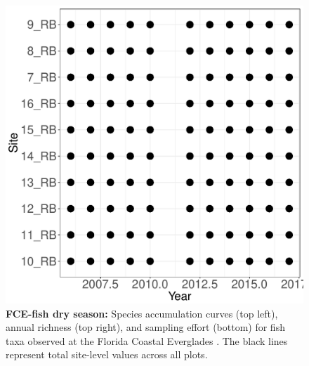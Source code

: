 \documentclass[11pt, oneside]{article}
\begin{document}
\begin{figure}[h!]
\includegraphics[scale = 0.4]{fce-fish-RehageDry_spatiotemporal_sampling_effort.pdf}
\caption{{\bf FCE-fish dry season:} Species accumulation curves (top left),  annual richness (top right), and sampling effort (bottom)  for fish taxa observed at the Florida Coastal Everglades . The black lines represent total site-level values across all plots.}
\label{fce-fish-dry}
\end{figure}
\end{document}

